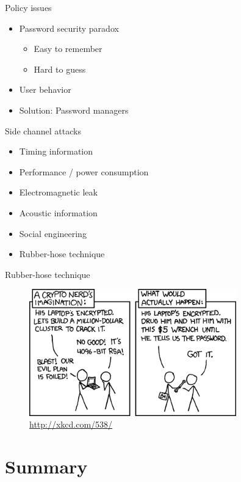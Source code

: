 \documentclass{curs}
\begin{document}
\begin{frame}{Policy issues}
  \begin{itemize}
    \item Password security paradox
      \begin{itemize}
        \item Easy to remember
        \item Hard to guess
      \end{itemize}
    \item User behavior
    \item Solution: Password managers
  \end{itemize}
\end{frame}

\begin{frame}{Side channel attacks}
  \begin{itemize}
    \item Timing information
    \item Performance / power consumption 
    \item Electromagnetic leak
    \item Acoustic information
    \item Social engineering
    \item Rubber-hose technique
  \end{itemize}
\end{frame}

\begin{frame}{Rubber-hose technique}
  \begin{figure}
    \centering
    \includegraphics[width=0.8\textwidth]{img/security-wrench.png} \\
    \tiny{\url{http://xkcd.com/538/}}
  \end{figure}
\end{frame}


\section{Summary}
\end{document}
